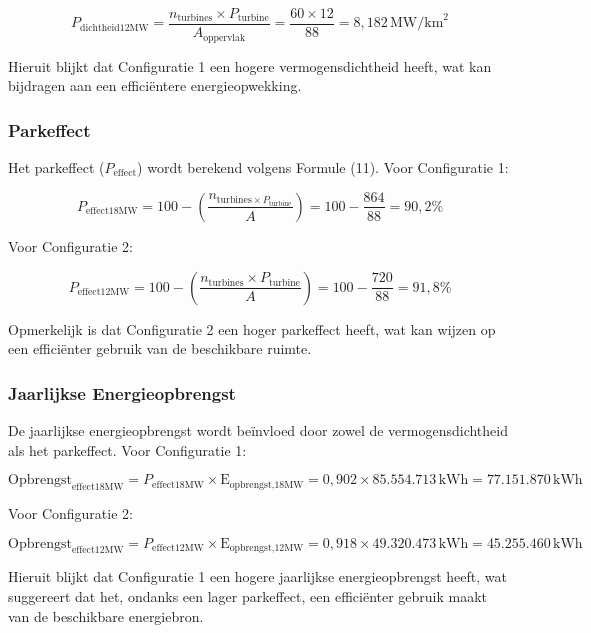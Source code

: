 \[
P_{\text{dichtheid12MW}} = \frac{{n_{\text{turbines}} \times P_{\text{turbine}}}}{{A_{\text{oppervlak}}}} = \frac{{60 \times 12}}{{88}} = 8,182 \, \text{MW/km}^2
\]

Hieruit blijkt dat Configuratie 1 een hogere vermogensdichtheid heeft, wat kan bijdragen aan een efficiëntere energieopwekking.

\subsubsection{Parkeffect}

Het parkeffect (\(P_{\text{effect}}\)) wordt berekend volgens Formule (11). Voor Configuratie 1:

\[
P_{\text{effect18MW}} = 100 - \left(\frac{{n_{\text{turbines} \times P_{\text{turbine}}}}}{{A}} \right) = 100 - \frac{{864}}{{88}} = 90,2\%
\]

Voor Configuratie 2:

\[
P_{\text{effect12MW}} = 100 - \left(\frac{{n_{\text{turbines}} \times P_{\text{turbine}}}}{{A}} \right) = 100 - \frac{{720}}{{88}} = 91,8\%
\]

Opmerkelijk is dat Configuratie 2 een hoger parkeffect heeft, wat kan wijzen op een efficiënter gebruik van de beschikbare ruimte.

\subsubsection{Jaarlijkse Energieopbrengst}

De jaarlijkse energieopbrengst wordt beïnvloed door zowel de vermogensdichtheid als het parkeffect. Voor Configuratie 1:

\[
\text{Opbrengst}_{\text{effect18MW}} = P_{\text{effect18MW}} \times \text{E}_{\text{opbrengst,18MW}} = 0,902 \times 85.554.713 \, \text{kWh} = 77.151.870 \, \text{kWh}
\]

Voor Configuratie 2:

\[
\text{Opbrengst}_{\text{effect12MW}} = P_{\text{effect12MW}} \times \text{E}_{\text{opbrengst,12MW}} = 0,918 \times 49.320.473 \, \text{kWh} = 45.255.460 \, \text{kWh}
\]

Hieruit blijkt dat Configuratie 1 een hogere jaarlijkse energieopbrengst heeft, wat suggereert dat het, ondanks een lager parkeffect, een efficiënter gebruik maakt van de beschikbare energiebron.
